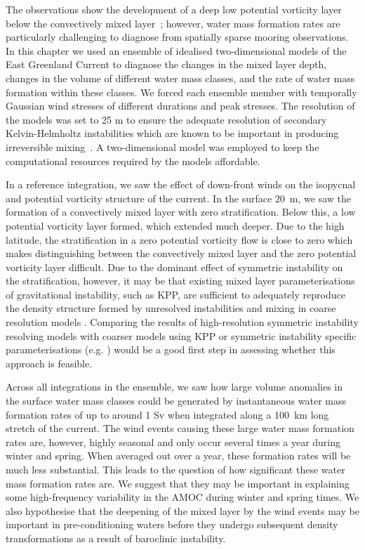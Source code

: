 The observations show the development of a deep low potential vorticity layer below the convectively mixed layer~\citep{LeBras2022}; however, water mass formation rates are particularly challenging to diagnose from spatially sparse mooring observations. In this chapter we used an ensemble of idealised two-dimensional models of the East Greenland Current to diagnose the changes in the mixed layer depth, changes in the volume of different water mass classes, and the rate of water mass formation within these classes. We forced each ensemble member with temporally Gaussian wind stresses of different durations and peak stresses. The resolution of the models was set to 25 m to ensure the adequate resolution of secondary Kelvin-Helmholtz instabilities which are known to be important in producing irreversible mixing~\citep{Yankovsky2019, Griffiths2003a}. A two-dimensional model was employed to keep the computational resources required by the models affordable\footnotemark.

In a reference integration, we saw the effect of down-front winds on the isopycnal and potential vorticity structure of the current. In the surface 20~m, we saw the formation of a convectively mixed layer with zero stratification. Below this, a low potential vorticity layer formed, which extended much deeper. Due to the high latitude, the stratification in a zero potential vorticity flow is close to zero which makes distinguishing between the convectively mixed layer and the zero potential vorticity layer difficult. Due to the dominant effect of symmetric instability on the stratification, however, it may be that existing mixed layer parameterisations of gravitational instability, such as KPP, are sufficient to adequately reproduce the density structure formed by unresolved instabilities and mixing in coarse resolution models \citep{Large1994}. Comparing the results of high-resolution symmetric instability resolving models with coarser models using KPP or symmetric instability specific parameterisations (e.g. \citet{Bachman2017, Yankovsky2021}) would be a good first step in assessing whether this approach is feasible.

Across all integrations in the ensemble, we saw how large volume anomalies in the surface water mass classes could be generated by instantaneous water mass formation rates of up to around 1 Sv when integrated along a 100~km long stretch of the current. The wind events causing these large water mass formation rates are, however, highly seasonal and only occur several times a year during winter and spring. When averaged out over a year, these formation rates will be much less substantial. This leads to the question of how significant these water mass formation rates are. We suggest that they may be important in explaining some high-frequency variability in the AMOC during winter and spring times. We also hypothesise that the deepening of the mixed layer by the wind events may be important in pre-conditioning waters before they undergo subsequent density transformations as a result of baroclinic instability.

